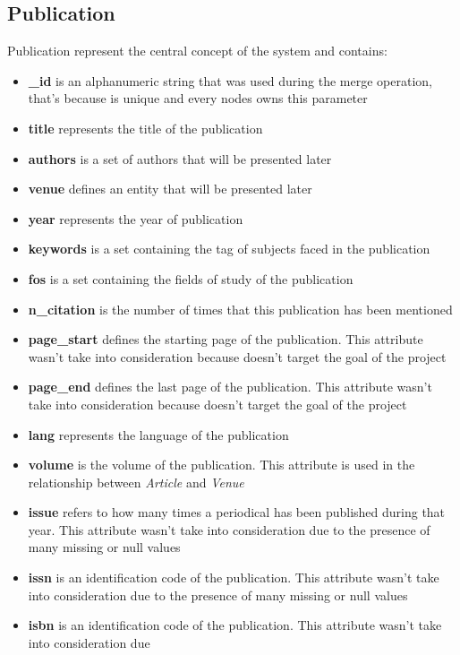 \documentclass{Configuration_Files/PoliMi3i_thesis}
\begin{document}
\subsection{Publication}
Publication represent the central concept of the system and contains:
\begin{itemize}
    \item \textbf{\_id} is an alphanumeric string that was used during the merge operation, that's because is unique and
            every nodes owns this parameter
    \item \textbf{title} represents the title of the publication
    \item \textbf{authors} is a set of authors that will be presented later
    \item \textbf{venue} defines an entity that will be presented later
    \item \textbf{year} represents the year of publication
    \item \textbf{keywords} is a set containing the tag of subjects faced in the publication
    \item \textbf{fos} is a set containing the fields of study of the publication
    \item \textbf{n\_citation} is the number of times that this publication has been mentioned
    \item \textbf{page\_start} defines the starting page of the publication. This attribute wasn't take into consideration
            because doesn't target the goal of the project
    \item \textbf{page\_end} defines the last page of the publication. This attribute wasn't take into consideration
            because doesn't target the goal of the project
    \item \textbf{lang} represents the language of the publication
    \item \textbf{volume} is the volume of the publication. This attribute is used in the relationship between \emph{Article}
            and \emph{Venue}
    \item \textbf{issue} refers to how many times a periodical has been published during that year. This attribute 
            wasn't take into consideration due to the presence of many missing or null values
    \item \textbf{issn} is an identification code of the publication. This attribute wasn't take into consideration due
            to the presence of many missing or null values
    \item \textbf{isbn} is an identification code of the publication. This attribute wasn't take into consideration due

\end{itemize}
\end{document}
